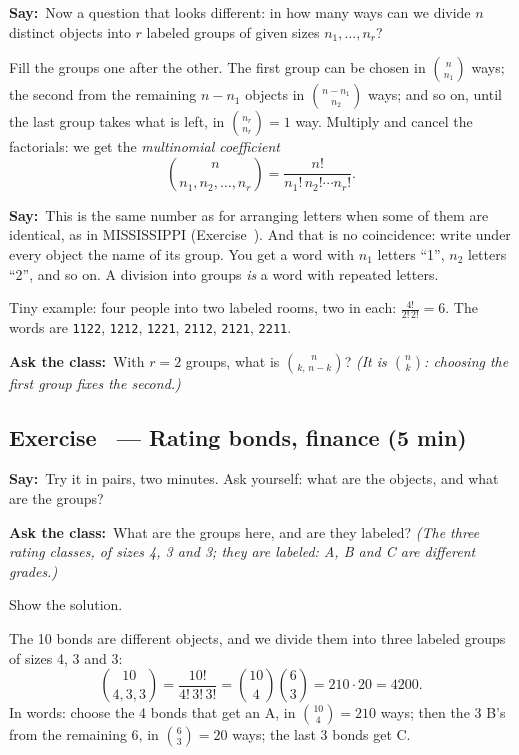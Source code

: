 \documentclass[11pt,a4paper,parskip=half]{scrartcl}
\newcommand{\say}{\textbf{\color{teal}Say:}\ }
\newcommand{\ask}{\textbf{\color{navy}Ask the class:}\ }
\begin{document}
\say Now a question that looks different: in how many ways can we divide
$n$ distinct objects into $r$ labeled groups of given sizes
$n_1,\dots,n_r$?

Fill the groups one after the other. The first group can be chosen in
$\binom{n}{n_1}$ ways; the second from the remaining $n-n_1$ objects in
$\binom{n-n_1}{n_2}$ ways; and so on, until the last group takes what is
left, in $\binom{n_r}{n_r}=1$ way. Multiply and cancel the factorials: we get
the \emph{multinomial coefficient}
\[ \binom{n}{n_1,n_2,\dots,n_r}=\frac{n!}{n_1!\,n_2!\cdots n_r!}. \]

\say This is the same number as for arranging letters when some of them are
identical, as in MISSISSIPPI (Exercise~). And
that is no coincidence: write under every object the name of its group. You
get a word with $n_1$ letters ``1'', $n_2$ letters ``2'', and so on. A
division into groups \emph{is} a word with repeated letters.

Tiny example: four people into two labeled rooms, two in each:
$\frac{4!}{2!\,2!}=6$. The words are \texttt{1122}, \texttt{1212},
\texttt{1221}, \texttt{2112}, \texttt{2121}, \texttt{2211}.

\ask With $r=2$ groups, what is $\binom{n}{k,\,n-k}$? \emph{(It is
$\binom nk$: choosing the first group fixes the second.)}

\subsection{Exercise~ --- Rating bonds, finance (5 min)}


\say Try it in pairs, two minutes. Ask yourself: what are the objects, and
what are the groups?

\ask What are the groups here, and are they labeled? \emph{(The three rating
classes, of sizes 4, 3 and 3; they are labeled: A, B and C are different
grades.)}

\begin{slidecue}
	Show the solution.
\end{slidecue}

The 10 bonds are different objects, and we divide them into three labeled
groups of sizes 4, 3 and 3:
\[ \binom{10}{4,3,3}=\frac{10!}{4!\,3!\,3!}=\binom{10}{4}\binom63
	=210\cdot20=4200. \]
In words: choose the 4 bonds that get an A, in $\binom{10}{4}=210$ ways; then
the 3 B's from the remaining 6, in $\binom63=20$ ways; the last 3 bonds get
C.
\end{document}
